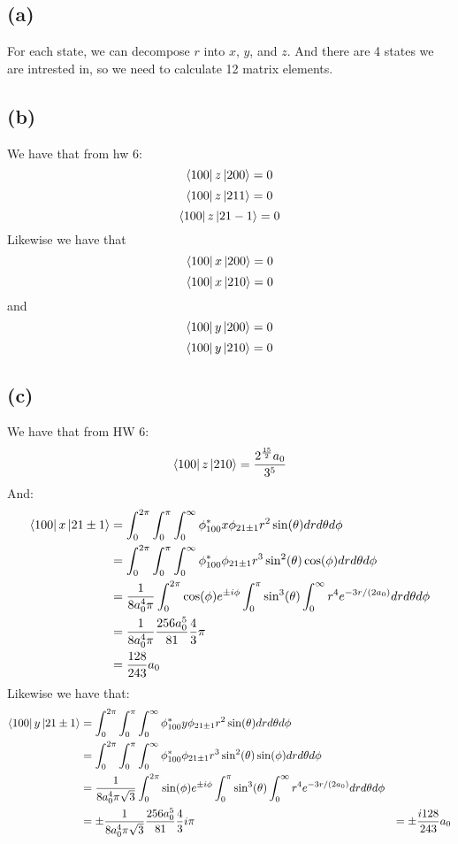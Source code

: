 \documentclass[11pt]{article}
\begin{document}
\subsection*{(a)}
For each state, we can decompose $r$ into $x$, $y$, and $z$. And there 
are 4 states we are intrested in, so we need to calculate 12 matrix elements. 
\subsection*{(b)}
We have that from hw 6:
$$\bra{100}z\ket{200} =0$$
$$\bra{100}z\ket{211} =0$$
$$\bra{100}z\ket{21-1} =0$$
Likewise we have that 
$$\bra{100}x\ket{200} =0$$
$$\bra{100}x\ket{210} = 0$$
and 
$$\bra{100}y\ket{200} =0$$
$$\bra{100}y\ket{210} = 0$$
\subsection*{(c)}
We have that from HW 6:
$$\bra{100}z\ket{210} = \frac{2^{\frac{15}{2}}a_0}{3^5}$$
And:
\begin{align*}
    \bra{100}x\ket{21\pm1} &= \int_{0}^{2\pi}\int_{0}^{\pi}\int_{0}^{\infty} \phi_{100}^*x\phi_{21\pm1}r^2\sin(\theta)drd\theta d\phi\\
    &= \int_{0}^{2\pi}\int_{0}^{\pi}\int_{0}^{\infty} \phi_{100}^*\phi_{21\pm1} r^3\sin^2(\theta)\cos(\phi)drd\theta d\phi\\
    &= \frac{1}{8a_0^4\pi }\int_{0}^{2\pi}\cos(\phi)e^{\pm i\phi}\int_{0}^{\pi}\sin^3(\theta)\int_{0}^{\infty} r^4e^{-3r/(2a_0)}drd\theta d\phi\\
    &=\frac{1}{8a_0^4\pi}\frac{256a_0^5}{81}\frac{4}{3} \pi\\
    &= \frac{128}{243}a_0
\end{align*}
Likewise we have that:
\begin{align*}
    \bra{100}y\ket{21\pm1} &= \int_{0}^{2\pi}\int_{0}^{\pi}\int_{0}^{\infty} \phi_{100}^*y\phi_{21\pm1}r^2\sin(\theta)drd\theta d\phi\\
    &= \int_{0}^{2\pi}\int_{0}^{\pi}\int_{0}^{\infty} \phi_{100}^*\phi_{21\pm1} r^3\sin^2(\theta)\sin(\phi)drd\theta d\phi\\
    &= \frac{1}{8a_0^4\pi \sqrt{3}}\int_{0}^{2\pi}\sin(\phi)e^{\pm i\phi}\int_{0}^{\pi}\sin^3(\theta)\int_{0}^{\infty} r^4e^{-3r/(2a_0)}drd\theta d\phi\\
    &=\pm\frac{1}{8a_0^4\pi \sqrt{3}}\frac{256a_0^5}{81}\frac{4}{3} i\pi
    &= \pm\frac{i128}{243}a_0
\end{align*}
\end{document}
